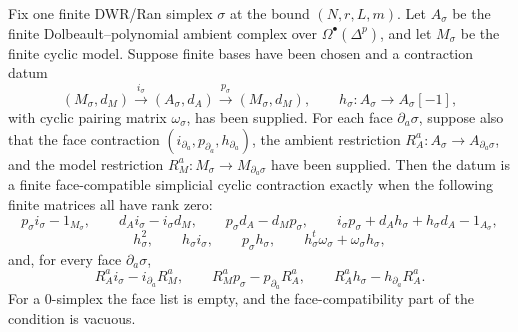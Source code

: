 \begin{proposition}
\label{prop:finite-simplicial-cyclic-contraction-gate}
Fix one finite DWR/Ran simplex \(\sigma\) at the bound \((N,r,L,m)\).
Let \(A_\sigma\) be the finite Dolbeault--polynomial ambient complex
over \(\Omega^\bullet(\Delta^p)\), and let \(M_\sigma\) be the finite
cyclic model. Suppose finite bases have been chosen and a contraction
datum
\[
(M_\sigma,d_M)
\xrightarrow{\ i_\sigma\ }
(A_\sigma,d_A)
\xrightarrow{\ p_\sigma\ }
(M_\sigma,d_M),
\qquad
h_\sigma\colon A_\sigma\to A_\sigma[-1],
\]
with cyclic pairing matrix \(\omega_\sigma\), has been supplied. For
each face \(\partial_a\sigma\), suppose also that the face contraction
\((i_{\partial_a},p_{\partial_a},h_{\partial_a})\), the ambient
restriction \(R_A^a\colon A_\sigma\to A_{\partial_a\sigma}\), and the
model restriction \(R_M^a\colon M_\sigma\to M_{\partial_a\sigma}\) have
been supplied. Then the datum is a finite face-compatible simplicial
cyclic contraction exactly when the following finite matrices all have
rank zero:
\[
p_\sigma i_\sigma-1_{M_\sigma},\qquad
d_A i_\sigma-i_\sigma d_M,\qquad
p_\sigma d_A-d_Mp_\sigma,\qquad
i_\sigma p_\sigma+d_Ah_\sigma+h_\sigma d_A-1_{A_\sigma},
\]
\[
h_\sigma^2,\qquad h_\sigma i_\sigma,\qquad
p_\sigma h_\sigma,\qquad
h_\sigma^t\omega_\sigma+\omega_\sigma h_\sigma,
\]
and, for every face \(\partial_a\sigma\),
\[
R_A^a i_\sigma-i_{\partial_a}R_M^a,\qquad
R_M^a p_\sigma-p_{\partial_a}R_A^a,\qquad
R_A^a h_\sigma-h_{\partial_a}R_A^a .
\]
For a \(0\)-simplex the face list is empty, and the face-compatibility
part of the condition is vacuous.
\end{proposition}

